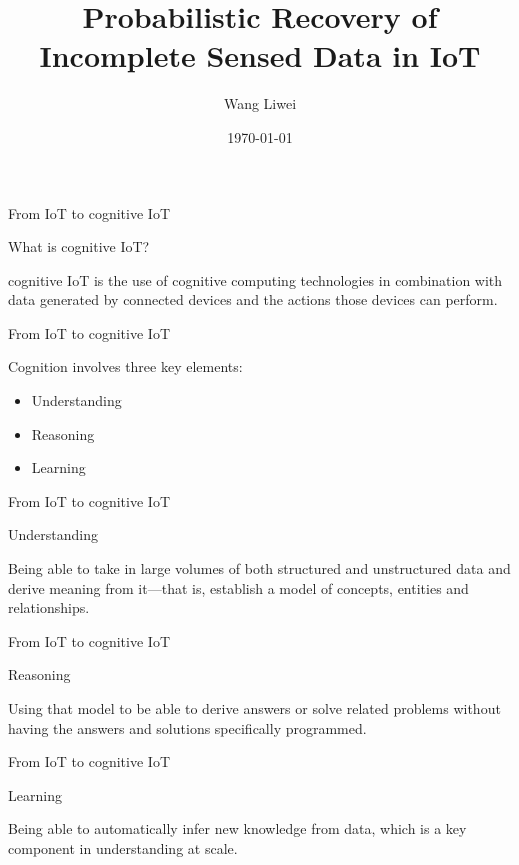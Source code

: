 \documentclass{beamer}
\title[Data recovery of IoT]    {Probabilistic Recovery of Incomplete Sensed Data in IoT}
\author{Wang Liwei}
\institute{Auckland University}
\date{\today}
\begin{document}
\begin{frame}
  \titlepage
\end{frame}


\begin{frame} {From IoT to cognitive IoT}
   \
   {\Large What is cognitive IoT?\par}
  
  \vskip 1cm
      cognitive IoT is the use of cognitive computing technologies in combination with data generated by connected devices and the actions those devices can perform. 
\end{frame}

\begin{frame} {From IoT to cognitive IoT}
   \
   {\Large Cognition involves three key elements: \par}
  
  \vskip 1cm
  \begin{itemize}
      \item Understanding
      \item Reasoning
      \item Learning
  \end{itemize}
\end{frame}

\begin{frame} {From IoT to cognitive IoT}
   \
   {\Large Understanding\par}
  
  \vskip 1cm
      Being able to take in large volumes of both structured and unstructured data and derive meaning from it—that is, establish a model of concepts, entities and relationships. 
\end{frame}

\begin{frame} {From IoT to cognitive IoT}
   \
   {\Large Reasoning\par}
  
  \vskip 1cm
      Using that model to be able to derive answers or solve related problems without having the answers and solutions specifically programmed. 
\end{frame}

\begin{frame} {From IoT to cognitive IoT}
   \
   {\Large Learning\par}
  
  \vskip 1cm
      Being able to automatically infer new knowledge from data, which is a key component in understanding at scale. 
\end{frame}
\end{document}
